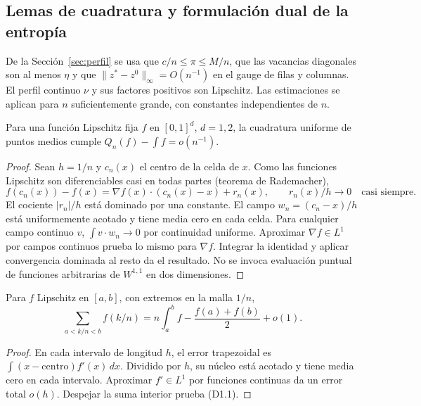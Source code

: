 \subsection{Lemas de cuadratura y formulación dual de la entropía}\label{sec:D01}
De la Sección~\ref{sec:perfil} se usa que $c/n\le\pi\le M/n$, que las vacancias diagonales son
al menos $\eta$ y que $\|z^*-z^0\|_\infty=O(n^{-1})$ en el gauge de filas y columnas.
El perfil continuo $\nu$ y sus factores positivos son Lipschitz.
Las estimaciones se aplican para $n$ suficientemente grande, con constantes independientes de $n$.

\begin{lema}\label{lem:puntosmedios}
Para una función Lipschitz fija $f$ en $[0,1]^d$, $d=1,2$,
la cuadratura uniforme de puntos medios cumple
$Q_n(f)-\int f=o(n^{-1})$.
\end{lema}
\begin{proof}
Sean $h=1/n$ y $c_n(x)$ el centro de la celda de $x$.
Como las funciones Lipschitz son diferenciables casi en todas partes (teorema de Rademacher),
\[
 f(c_n(x))-f(x)=\nabla f(x)\cdot(c_n(x)-x)+r_n(x),
 \qquad r_n(x)/h\longrightarrow0\quad\text{casi siempre}.
\]
El cociente $|r_n|/h$ está dominado por una constante.
El campo $w_n=(c_n-x)/h$ está uniformemente acotado y tiene
media cero en cada celda. Para cualquier campo continuo $v$,
$\int v\cdot w_n\to0$ por continuidad uniforme.
Aproximar $\nabla f\in L^1$ por campos continuos prueba lo mismo
para $\nabla f$. Integrar la identidad y aplicar convergencia
dominada al resto da el resultado.
No se invoca evaluación puntual de funciones arbitrarias de $W^{1,1}$
en dos dimensiones.
\end{proof}

\begin{lema}
Para $f$ Lipschitz en $[a,b]$, con extremos en la malla $1/n$,
\[
 \sum_{a<k/n<b}f(k/n)
 =n\int_a^b f-\frac{f(a)+f(b)}2+o(1).             \tag{D1.1}
\]
\end{lema}
\begin{proof}
En cada intervalo de longitud $h$, el error trapezoidal es
$\int (x-\text{centro})f'(x)\,dx$.
Dividido por $h$, su núcleo está acotado y tiene media cero
en cada intervalo. Aproximar $f'\in L^1$ por funciones continuas
da un error total $o(h)$. Despejar la suma interior prueba (D1.1).
\end{proof}

